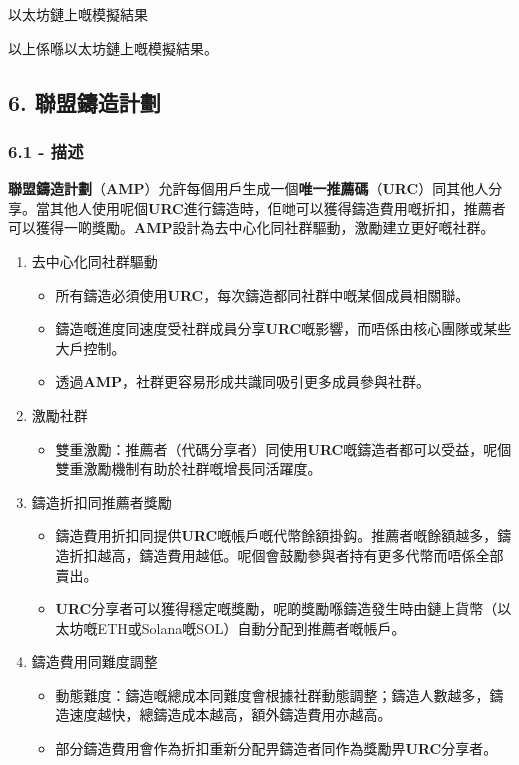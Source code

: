 \documentclass[
]{article}
\providecommand{\tightlist}{%
  \setlength{\itemsep}{0pt}\setlength{\parskip}{0pt}}
\begin{document}
以太坊鏈上嘅模擬結果

以上係喺以太坊鏈上嘅模擬結果。

\subsection{6. 聯盟鑄造計劃}\label{ux806fux76dfux9444ux9020ux8a08ux5283}

\subsubsection{6.1 - 描述}\label{ux63cfux8ff0}

\textbf{聯盟鑄造計劃}（\textbf{AMP}）允許每個用戶生成一個\textbf{唯一推薦碼}（\textbf{URC}）同其他人分享。當其他人使用呢個\textbf{URC}進行鑄造時，佢哋可以獲得鑄造費用嘅折扣，推薦者可以獲得一啲獎勵。\textbf{AMP}設計為去中心化同社群驅動，激勵建立更好嘅社群。

\begin{enumerate}
\def\labelenumi{\arabic{enumi}.}
\tightlist
\item
  去中心化同社群驅動

  \begin{itemize}
  \tightlist
  \item
    所有鑄造必須使用\textbf{URC}，每次鑄造都同社群中嘅某個成員相關聯。
  \item
    鑄造嘅進度同速度受社群成員分享\textbf{URC}嘅影響，而唔係由核心團隊或某些大戶控制。
  \item
    透過\textbf{AMP}，社群更容易形成共識同吸引更多成員參與社群。
  \end{itemize}
\item
  激勵社群

  \begin{itemize}
  \tightlist
  \item
    雙重激勵：推薦者（代碼分享者）同使用\textbf{URC}嘅鑄造者都可以受益，呢個雙重激勵機制有助於社群嘅增長同活躍度。
  \end{itemize}
\item
  鑄造折扣同推薦者獎勵

  \begin{itemize}
  \tightlist
  \item
    鑄造費用折扣同提供\textbf{URC}嘅帳戶嘅代幣餘額掛鈎。推薦者嘅餘額越多，鑄造折扣越高，鑄造費用越低。呢個會鼓勵參與者持有更多代幣而唔係全部賣出。
  \item
    \textbf{URC}分享者可以獲得穩定嘅獎勵，呢啲獎勵喺鑄造發生時由鏈上貨幣（以太坊嘅ETH或Solana嘅SOL）自動分配到推薦者嘅帳戶。
  \end{itemize}
\item
  鑄造費用同難度調整

  \begin{itemize}
  \tightlist
  \item
    動態難度：鑄造嘅總成本同難度會根據社群動態調整；鑄造人數越多，鑄造速度越快，總鑄造成本越高，額外鑄造費用亦越高。
  \item
    部分鑄造費用會作為折扣重新分配畀鑄造者同作為獎勵畀\textbf{URC}分享者。
  \end{itemize}
\end{enumerate}
\end{document}
